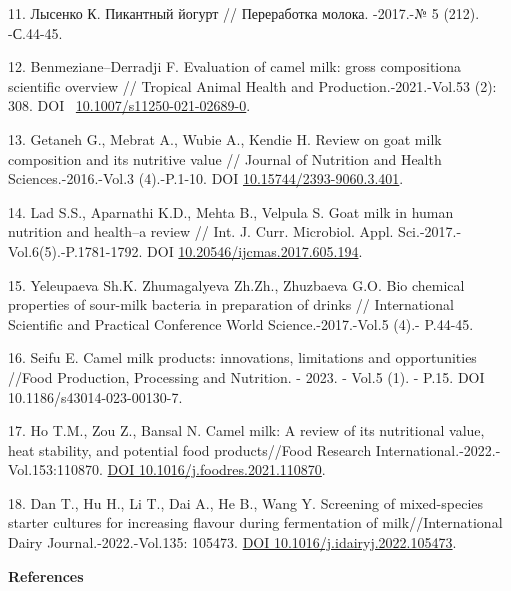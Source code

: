\begin{refs}
11. Лысенко К. Пикантный йогурт // Переработка молока. -2017.-№ 5 (212).
-С.44-45.

12. Benmeziane--Derradji F. Evaluation of camel milk: gross compositiona
scientific overview // Tropical Animal Health and
Production.-2021.-Vol.53 (2): 308. DOI
~\href{https://doi.org/10.1007/s11250-021-02689-0}{10.1007/s11250-021-02689-0}.

13. Getaneh G., Mebrat A., Wubie A., Kendie H. Review on goat milk
composition and its nutritive value // Journal of Nutrition and Health
Sciences.-2016.-Vol.3 (4).-P.1-10. DOI
\href{http://dx.doi.org/10.15744/2393-9060.3.401}{10.15744/2393-9060.3.401}.

14. Lad S.S., Aparnathi K.D., Mehta B., Velpula S. Goat milk in human
nutrition and health--a review // Int. J. Curr. Microbiol. Appl.
Sci.-2017.-Vol.6(5).-P.1781-1792. DOI
\href{http://dx.doi.org/10.20546/ijcmas.2017.605.194}{10.20546/ijcmas.2017.605.194}.

15. Yeleupaeva Sh.K. Zhumagalyeva Zh.Zh., Zhuzbaeva G.O. Bio chemical
properties of sour-milk bacteria in preparation of drinks //
International Scientific and Practical Conference World
Science.-2017.-Vol.5 (4).- P.44-45.

16. Seifu E. Camel milk products: innovations, limitations and
opportunities //Food Production, Processing and Nutrition. - 2023. -
Vol.5 (1). - P.15. DOI 10.1186/s43014-023-00130-7.

17. Ho T.M., Zou Z., Bansal N. Camel milk: A review of its nutritional
value, heat stability, and potential food products//Food Research
International.-2022.-Vol.153:110870.
\href{https://doi.org/10.1016/j.foodres.2021.110870}{DOI
10.1016/j.foodres.2021.110870}.

18. Dan T., Hu H., Li T., Dai A., He B., Wang Y. Screening of
mixed-species starter cultures for increasing flavour during
fermentation of milk//International Dairy Journal.-2022.-Vol.135:
105473. \href{https://doi.org/10.1016/j.idairyj.2022.105473}{DOI
10.1016/j.idairyj.2022.105473}.
\end{refs}

\begin{center}
{\bfseries References}
\end{center}

